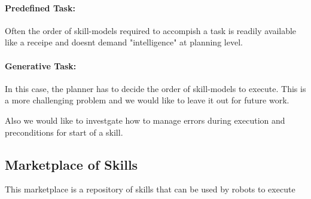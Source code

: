 \paragraph{Predefined Task:} Often the order of skill-models required to accompish a task is readily available like a receipe and doesnt demand "intelligence" at planning level. 

\paragraph{Generative Task:} In this case, the planner has to decide the order of skill-models to execute. This is a more challenging problem and we would like to leave it out for future work.

Also we would like to investgate how to manage errors during execution and preconditions for start of a skill.


\subsection{Marketplace of Skills}

This marketplace is a repository of skills that can be used by robots to execute